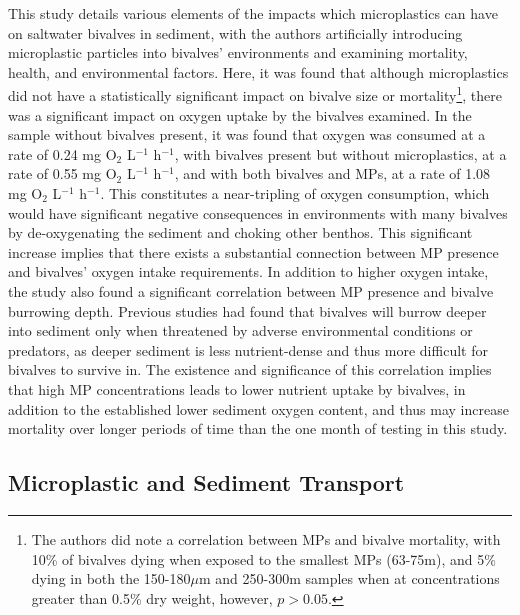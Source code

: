 \documentclass[fleqn,10pt]{SelfArx} %
\begin{document}
	This study details various elements of the impacts which microplastics can have on saltwater bivalves in sediment, with the authors artificially introducing microplastic particles into bivalves' environments and examining mortality, health, and environmental factors. Here, it was found that although microplastics did not have a statistically significant impact on bivalve size or mortality\footnote{The authors did note a correlation between MPs and bivalve mortality, with 10\% of bivalves dying when exposed to the smallest MPs (63-75\textmu m), and 5\% dying in both the 150-180$\mu$m and 250-300\textmu m samples when at concentrations greater than 0.5\% dry weight, however, $p > 0.05$.}, there was a significant impact on oxygen uptake by the bivalves examined. In the  sample  without bivalves present, it was found that oxygen was consumed at a rate of 0.24 mg O$_{2}$ L$^{-1}$ h$^{-1}$, with bivalves present but without microplastics, at a rate of 0.55 mg O$_{2}$ L$^{-1}$ h$^{-1}$, and with both bivalves and MPs, at a rate of 1.08 mg O$_{2}$ L$^{-1}$ h$^{-1}$. This constitutes a near-tripling of oxygen consumption, which would have significant negative consequences in environments with many bivalves by de-oxygenating the sediment and choking other benthos. This significant increase implies that there exists a substantial connection between MP presence and bivalves' oxygen intake requirements. 
	\linebreak
	In addition to higher oxygen intake, the study also found a significant correlation between MP presence and bivalve burrowing depth. Previous studies had found that bivalves will burrow deeper into sediment only when threatened by adverse environmental conditions or predators, as deeper sediment is less nutrient-dense and thus more difficult for bivalves to survive in. The existence and significance of this correlation implies that high MP concentrations leads to lower nutrient uptake by bivalves, in addition to the established lower sediment oxygen content, and thus may increase mortality over longer periods of time than the one month of testing in this study.
	
	\subsection{Microplastic and Sediment Transport}
\end{document}
